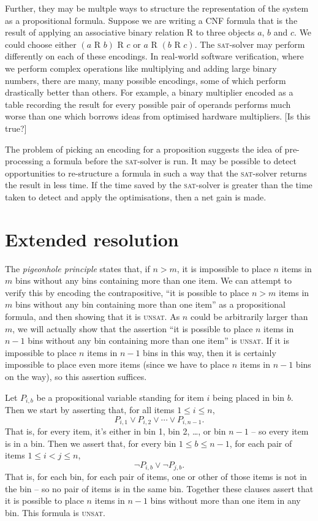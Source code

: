\documentclass[11pt]{article}
\newcommand{\sat}{\textsc{sat}}
\newcommand{\unsat}{\textsc{unsat}}
\begin{document}
Further, they may be multple ways to structure the representation of the system as a propositional formula. Suppose we are writing a CNF formula that is the result of applying an associative binary relation R to three objects $a$, $b$ and $c$. We could choose either $(a\mbox{ R }b)\mbox{ R }c$ or $a\mbox{ R }(b\mbox{ R }c)$. The \sat{}-solver may perform differently on each of these encodings. In real-world software verification, where we perform complex operations like multiplying and adding large binary numbers, there are many, many possible encodings, some of which perform drastically better than others. For example, a binary multiplier encoded as a table recording the result for every possible pair of operands performs much worse than one which borrows ideas from optimised hardware multipliers. [Is this true?]

The problem of picking an encoding for a proposition suggests the idea of pre-processing a formula before the \sat{}-solver is run. It may be possible to detect opportunities to re-structure a formula in such a way that the \sat{}-solver returns the result in less time. If the time saved by the \sat{}-solver is greater than the time taken to detect and apply the optimisations, then a net gain is made.

\section{Extended resolution}

The \emph{pigeonhole principle} states that, if $n > m$, it is impossible to place $n$ items in $m$ bins without any bins containing more than one item. We can attempt to verify this by encoding the contrapositive, ``it is possible to place $n>m$ items in $m$ bins without any bin containing more than one item'' as a propositional formula, and then showing that it is \unsat. As $n$ could be arbitrarily larger than $m$, we will actually show that the assertion ``it is possible to place $n$ items in $n-1$ bins without any bin containing more than one item'' is \unsat. If it is impossible to place $n$ items in $n-1$ bins in this way, then it is certainly impossible to place even more items (since we have to place $n$ items in $n-1$ bins on the way), so this assertion suffices.

Let $P_{i,b}$ be a propositional variable standing for item $i$ being placed in bin $b$. Then we start by asserting that, for all items $1 \leq i \leq n$,
$$P_{i,1} \vee P_{i,2} \vee \cdots \vee P_{i,n-1}.$$
That is, for every item, it's either in bin 1, bin 2, \dots, or bin $n-1$ -- so every item is in a bin. Then we assert that, for every bin $1 \leq b \leq n-1$, for each pair of items $1 \leq i < j \leq n$,
$$\neg P_{i,b} \vee \neg P_{j,b}.$$
That is, for each bin, for each pair of items, one or other of those items is not in the bin -- so no pair of items is in the same bin. Together these clauses assert that it is possible to place $n$ items in $n-1$ bins without more than one item in any bin. This formula is \unsat.
\end{document}
